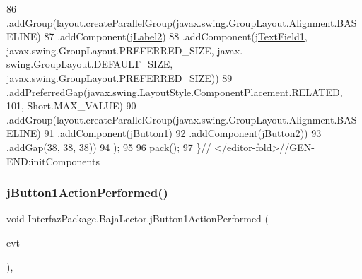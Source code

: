 \begin{DoxyCode}
86                 .addGroup(layout.createParallelGroup(javax.swing.GroupLayout.Alignment.BASELINE)
87                     .addComponent(\mbox{\hyperlink{class_interfaz_package_1_1_baja_lector_a9b41f7f44ecf39652a7f7938173d29c5}{jLabel2}})
88                     .addComponent(\mbox{\hyperlink{class_interfaz_package_1_1_baja_lector_a7a476ef16a2314a268fb7e53e32cdd31}{jTextField1}}, javax.swing.GroupLayout.PREFERRED\_SIZE, javax.
      swing.GroupLayout.DEFAULT\_SIZE, javax.swing.GroupLayout.PREFERRED\_SIZE))
89                 .addPreferredGap(javax.swing.LayoutStyle.ComponentPlacement.RELATED, 101, Short.MAX\_VALUE)
90                 .addGroup(layout.createParallelGroup(javax.swing.GroupLayout.Alignment.BASELINE)
91                     .addComponent(\mbox{\hyperlink{class_interfaz_package_1_1_baja_lector_ac8cdd8217744e010d4f23c911fafda3e}{jButton1}})
92                     .addComponent(\mbox{\hyperlink{class_interfaz_package_1_1_baja_lector_aea778ac52e2bd99213ebd7e1c1d23e09}{jButton2}}))
93                 .addGap(38, 38, 38))
94         );
95 
96         pack();
97     \}\textcolor{comment}{// </editor-fold>//GEN-END:initComponents}
\end{DoxyCode}
\mbox{\label{class_interfaz_package_1_1_baja_lector_a7ebc81bebee5f75046ff282093b4fb16}} 
\subsubsection{\texorpdfstring{j\+Button1\+Action\+Performed()}{jButton1ActionPerformed()}}
{\footnotesize\ttfamily void Interfaz\+Package.\+Baja\+Lector.\+j\+Button1\+Action\+Performed (\begin{DoxyParamCaption}\item[{java.\+awt.\+event.\+Action\+Event}]{evt }\end{DoxyParamCaption})\hspace{0.3cm}{\ttfamily [inline]}, {\ttfamily [private]}}


